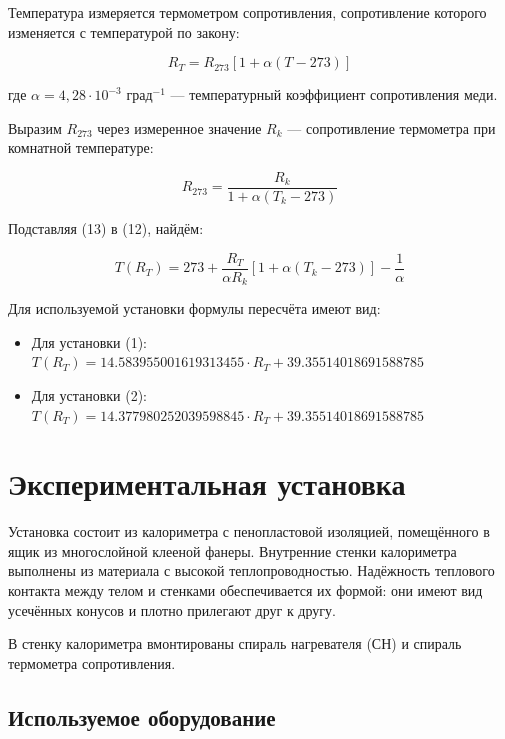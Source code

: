 \documentclass{article}
\begin{document}
Температура измеряется термометром сопротивления, сопротивление которого изменяется с температурой по закону:

\begin{equation}
R_T = R_{273}[1 + \alpha(T - 273)] \tag{12}
\end{equation}

где $\alpha = 4,28 \cdot 10^{-3}$ град$^{-1}$ — температурный коэффициент сопротивления меди.

Выразим $R_{273}$ через измеренное значение $R_k$ — сопротивление термометра при комнатной температуре:

\begin{equation}
R_{273} = \frac{R_k}{1 + \alpha(T_k - 273)} \tag{13}
\end{equation}

Подставляя (13) в (12), найдём:

\begin{equation}
T(R_T) = 273 + \frac{R_T}{\alpha R_k}[1 + \alpha(T_k - 273)] - \frac{1}{\alpha} \tag{14}
\end{equation}

Для используемой установки формулы пересчёта имеют вид:
\begin{itemize}
\item Для установки (1): $T(R_T) = 14.583955001619313455 \cdot R_T + 39.35514018691588785$
\item Для установки (2): $T(R_T) = 14.377980252039598845 \cdot R_T + 39.35514018691588785$
\end{itemize}

\section*{Экспериментальная установка}

Установка состоит из калориметра с пенопластовой изоляцией, помещённого в ящик из многослойной клееной фанеры. Внутренние стенки калориметра выполнены из материала с высокой теплопроводностью. Надёжность теплового контакта между телом и стенками обеспечивается их формой: они имеют вид усечённых конусов и плотно прилегают друг к другу.

В стенку калориметра вмонтированы спираль нагревателя (СН) и спираль термометра сопротивления.

\subsection*{Используемое оборудование}
\end{document}

